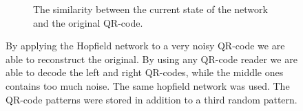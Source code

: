 \begin{figure}[H]
\begin{subfigure}{0.49\textwidth}
        \caption{The similarity between the current state of the network and the original QR-code.}
    \end{subfigure}
    \caption{By applying the Hopfield network to a very noisy QR-code we are able to reconstruct the original. By using any QR-code reader we are able to decode the left and right QR-codes, while the middle ones contains too much noise. The same hopfield network was used. The QR-code patterns were stored in addition to a third random pattern. }
\end{figure}